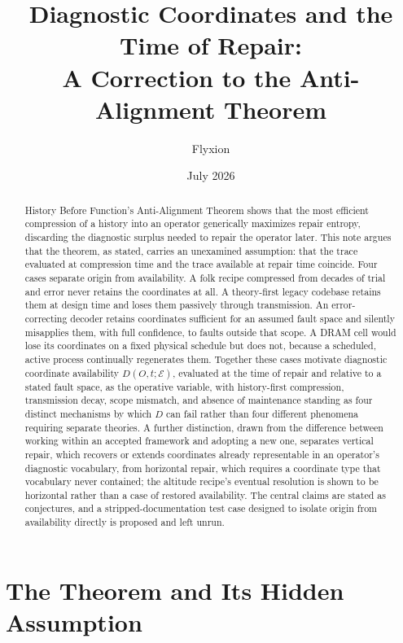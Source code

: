 \documentclass[11pt]{article}
\title{\textbf{Diagnostic Coordinates and the Time of Repair:\\ A Correction to the Anti-Alignment Theorem}}
\author{Flyxion}
\date{July 2026}
\begin{document}
\maketitle

\begin{abstract}
\noindent History Before Function's Anti-Alignment Theorem shows that the most efficient compression of a history into an operator generically maximizes repair entropy, discarding the diagnostic surplus needed to repair the operator later. This note argues that the theorem, as stated, carries an unexamined assumption: that the trace evaluated at compression time and the trace available at repair time coincide. Four cases separate origin from availability. A folk recipe compressed from decades of trial and error never retains the coordinates at all. A theory-first legacy codebase retains them at design time and loses them passively through transmission. An error-correcting decoder retains coordinates sufficient for an assumed fault space and silently misapplies them, with full confidence, to faults outside that scope. A DRAM cell would lose its coordinates on a fixed physical schedule but does not, because a scheduled, active process continually regenerates them. Together these cases motivate diagnostic coordinate availability $D(O,t;\mathcal{E})$, evaluated at the time of repair and relative to a stated fault space, as the operative variable, with history-first compression, transmission decay, scope mismatch, and absence of maintenance standing as four distinct mechanisms by which $D$ can fail rather than four different phenomena requiring separate theories. A further distinction, drawn from the difference between working within an accepted framework and adopting a new one, separates vertical repair, which recovers or extends coordinates already representable in an operator's diagnostic vocabulary, from horizontal repair, which requires a coordinate type that vocabulary never contained; the altitude recipe's eventual resolution is shown to be horizontal rather than a case of restored availability. The central claims are stated as conjectures, and a stripped-documentation test case designed to isolate origin from availability directly is proposed and left unrun.
\end{abstract}

\newpage

\section{The Theorem and Its Hidden Assumption}
\end{document}
